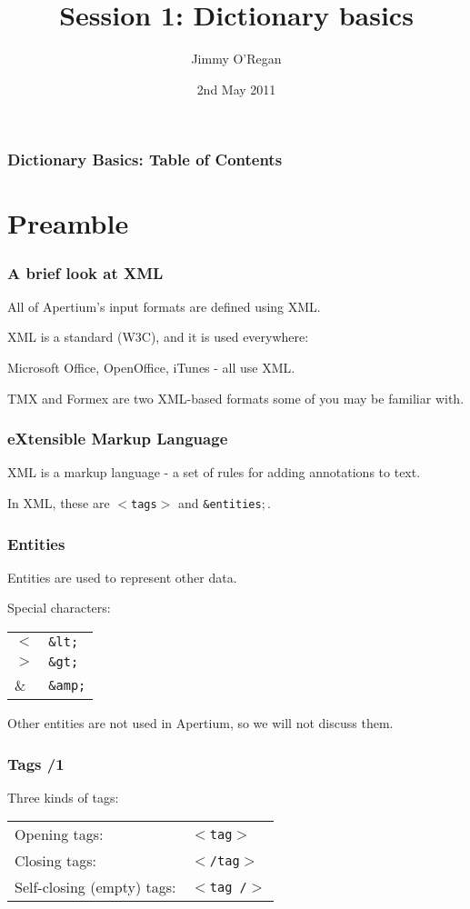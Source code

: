 \documentclass{beamer} %
\date{2nd May 2011}
\title{Session 1: Dictionary basics}
\author{Jimmy O'Regan}
\newcommand{\MyLogoBottomCentred}{
\begin{textblock}{14}(53.5,70)
  \pgfuseimage{logo}
\end{textblock}
}
\begin{document}
\frame{\titlepage \MyLogoBottomCentred}


\begin{frame}
  \frametitle{Dictionary Basics: Table of Contents}
  \tableofcontents
\end{frame}


\section{Preamble}

\begin{frame}
  \frametitle{A brief look at XML}
  All of Apertium's input formats are defined using XML.

  XML is a standard (W3C), and it is used everywhere:

  Microsoft Office, OpenOffice, iTunes - all use XML.

  TMX and Formex are two XML-based formats some of you may be familiar with.
\end{frame}

\begin{frame}
  \frametitle{eXtensible Markup Language}

  XML is a markup language - a set of rules for adding annotations to text.

  In XML, these are {\tt $<$tags$>$} and {\tt \&entities$;$}.

\end{frame}

\begin{frame}
  \frametitle{Entities}

  Entities are used to represent other data.

  \begin{exampleblock}{Special characters:}
    \begin{tabular}{ll}
      $<$ & {\tt \&lt;} \\
      $>$ & {\tt \&gt;} \\
      \& & {\tt \&amp;}
    \end{tabular}
  \end{exampleblock}

  Other entities are not used in Apertium, so we will not discuss them.

\end{frame}

\begin{frame}
  \frametitle{Tags /1}

  \begin{exampleblock}{Three kinds of tags:}
    \begin{tabular}{ll}
      Opening tags: & {\tt $<$tag$>$} \\
      Closing tags: & {\tt $<$/tag$>$} \\
      Self-closing (empty) tags: & {\tt $<$tag /$>$}
    \end{tabular}
  \end{exampleblock}

\end{frame}
\end{document}
